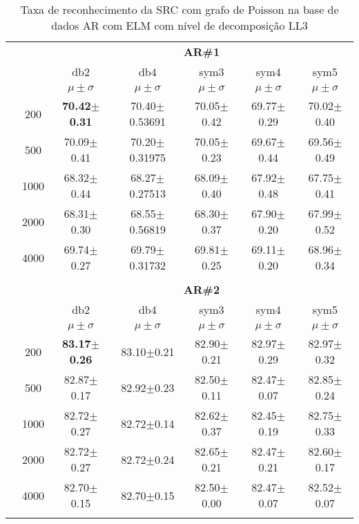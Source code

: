 \begin{table}[H]
	\centering
    \normalsize
	\caption{Taxa de reconhecimento da SRC com grafo de Poisson  na base de dados AR com ELM com nível de decomposição LL3}
		\begin{tabular}{|c|c|c c c c c|}
\cline{3-7}
\multicolumn{2}{c|}{\multirow{3}{*}{}} & \multicolumn{5}{c|}{\textbf{AR\#1}}   \\\cline{3-7} 
\multicolumn{2}{c|}{}  & db2 & db4 & sym3 & sym4 & sym5 \\\cline{3-7}%
\multicolumn{2}{c|}{}& $\mu \pm \sigma$ & $\mu \pm \sigma$ & $\mu \pm \sigma$ & $\mu \pm \sigma$ & $\mu \pm \sigma$ \\\hline


\multicolumn{1}{|c|}{ \multirow{5}{*}{\rotatebox[origin=c]{90}{\textbf{Neurônios}}} }
& 200	&\textbf{70.42$\pm$0.31}	&70.40$\pm$0.53691	&70.05$\pm$0.42	&69.77$\pm$0.29	&70.02$\pm$0.40	\\\cline{2-7}
& 500	&70.09$\pm$0.41	&70.20$\pm$0.31975	&70.05$\pm$0.23	&69.67$\pm$0.44	&69.56$\pm$0.49	\\\cline{2-7}
& 1000	&68.32$\pm$0.44	&68.27$\pm$0.27513	&68.09$\pm$0.40	&67.92$\pm$0.48	&67.75$\pm$0.41	\\\cline{2-7}
& 2000	&68.31$\pm$0.30	&68.55$\pm$0.56819	&68.30$\pm$0.37	&67.90$\pm$0.20	&67.99$\pm$0.52	\\\cline{2-7}
& 4000	&69.74$\pm$0.27	&69.79$\pm$0.31732	&69.81$\pm$0.25	&69.11$\pm$0.20	&68.96$\pm$0.34	

\\ \midrule
\multicolumn{7}{c}{}\\ 


\cline{3-7}
\multicolumn{2}{c|}{\multirow{3}{*}{}} & \multicolumn{5}{c|}{\textbf{AR\#2}}   \\\cline{3-7} 
\multicolumn{2}{c|}{}  & db2 & db4 & sym3 & sym4 & sym5 \\\cline{3-7}%
\multicolumn{2}{c|}{}& $\mu \pm \sigma$ & $\mu \pm \sigma$ & $\mu \pm \sigma$ & $\mu \pm \sigma$ & $\mu \pm \sigma$ \\\hline

\multicolumn{1}{|c|}{ \multirow{5}{*}{\rotatebox[origin=c]{90}{\textbf{Neurônios}}} }
& 200	    &\textbf{83.17$\pm$0.26}	&83.10$\pm$0.21	&82.90$\pm$0.21	&82.97$\pm$0.29	&82.97$\pm$0.32	\\\cline{2-7}
& 500	    &82.87$\pm$0.17	&82.92$\pm$0.23	&82.50$\pm$0.11	&82.47$\pm$0.07	&82.85$\pm$0.24	\\\cline{2-7}
& 1000	    &82.72$\pm$0.27	&82.72$\pm$0.14	&82.62$\pm$0.37	&82.45$\pm$0.19	&82.75$\pm$0.33	\\\cline{2-7}
& 2000	    &82.72$\pm$0.27	&82.72$\pm$0.24	&82.65$\pm$0.21	&82.47$\pm$0.21	&82.60$\pm$0.17	\\\cline{2-7}
& 4000	    &82.70$\pm$0.15	&82.70$\pm$0.15	&82.50$\pm$0.00	&82.47$\pm$0.07	&82.52$\pm$0.07\\ \midrule
\multicolumn{7}{c}{}\\ 



\end{tabular}
\end{table}
